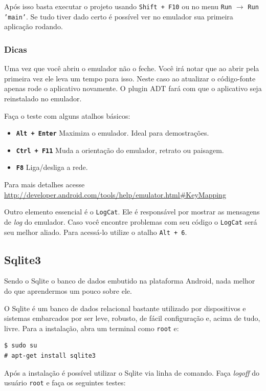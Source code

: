 Após isso basta executar o projeto usando \texttt{Shift + F10} ou no
menu \texttt{Run} $\rightarrow$ \texttt{Run 'main'}. Se tudo tiver dado
certo é possível ver no emulador sua primeira aplicação rodando.

\subsubsection{Dicas}

Uma vez que você abriu o emulador não o feche. Você irá notar que ao
abrir pela primeira vez ele leva um tempo para isso. Neste caso ao
atualizar o código-fonte apenas rode o aplicativo novamente. O plugin
ADT fará com que o aplicativo seja reinstalado no emulador.

Faça o teste com alguns atalhos básicos:

\begin{itemize}
\item
  \textbf{\texttt{Alt + Enter}} Maximiza o emulador. Ideal para
  demostrações.
\item
  \textbf{\texttt{Ctrl + F11}} Muda a orientação do emulador, retrato ou
  paisagem.
\item
  \textbf{\texttt{F8}} Liga/desliga a rede.
\end{itemize}
Para mais detalhes acesse
\url{http://developer.android.com/tools/help/emulator.html#KeyMapping}

Outro elemento essencial é o \texttt{LogCat}. Ele é responsável por
mostrar as mensagens de \emph{log} do emulador. Caso você encontre
problemas com seu código o \texttt{LogCat} será seu melhor aliado. Para
acessá-lo utilize o atalho \texttt{Alt + 6}.

\subsection{Sqlite3}

Sendo o Sqlite o banco de dados embutido na plataforma Android, nada
melhor do que aprendermos um pouco sobre ele.

O Sqlite é um banco de dados relacional bastante utilizado por
dispositivos e sistemas embarcados por ser leve, robusto, de fácil
configuração e, acima de tudo, livre. Para a instalação, abra um
terminal como \texttt{root} e:

\begin{verbatim}
$ sudo su
# apt-get install sqlite3
\end{verbatim}
Após a instalação é possível utilizar o Sqlite via linha de comando.
Faça \emph{logoff} do usuário \texttt{root} e faça os seguintes testes:

